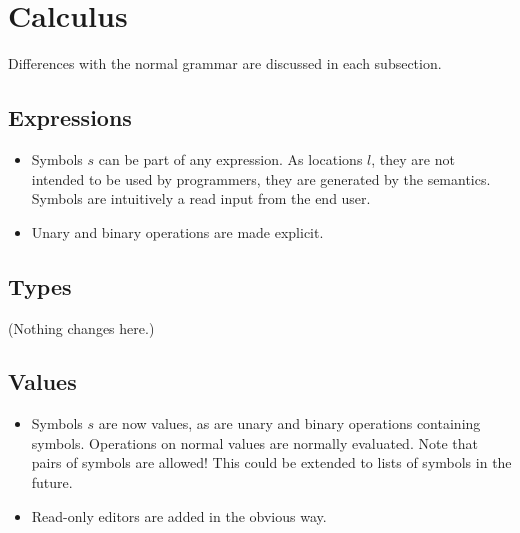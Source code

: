 

\section{Calculus}
\label{sec:language}

Differences with the normal grammar are discussed in each subsection.


\subsection{Expressions}


\begin{itemize}
  \item
    Symbols $s$ can be part of any expression.
    As locations $l$, they are not intended to be used by programmers,
    they are generated by the semantics.
    Symbols are intuitively a read input from the end user.
  \item
    Unary and binary operations are made explicit.
\end{itemize}


\subsection{Types}


(Nothing changes here.)


\subsection{Values}


\begin{itemize}
  \item
    Symbols $s$ are now values,
    as are unary and binary operations containing symbols.
    Operations on normal values are normally evaluated.
    Note that pairs of symbols are allowed!
    This could be extended to lists of symbols in the future.
\end{itemize}


\begin{itemize}
  \item Read-only editors are added in the obvious way.
\end{itemize}



